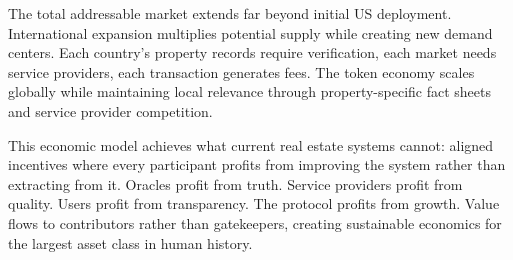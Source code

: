 The total addressable market extends far beyond initial US deployment. International expansion multiplies potential supply while creating new demand centers. Each country's property records require verification, each market needs service providers, each transaction generates fees. The token economy scales globally while maintaining local relevance through property-specific fact sheets and service provider competition.

This economic model achieves what current real estate systems cannot: aligned incentives where every participant profits from improving the system rather than extracting from it. Oracles profit from truth. Service providers profit from quality. Users profit from transparency. The protocol profits from growth. Value flows to contributors rather than gatekeepers, creating sustainable economics for the largest asset class in human history.